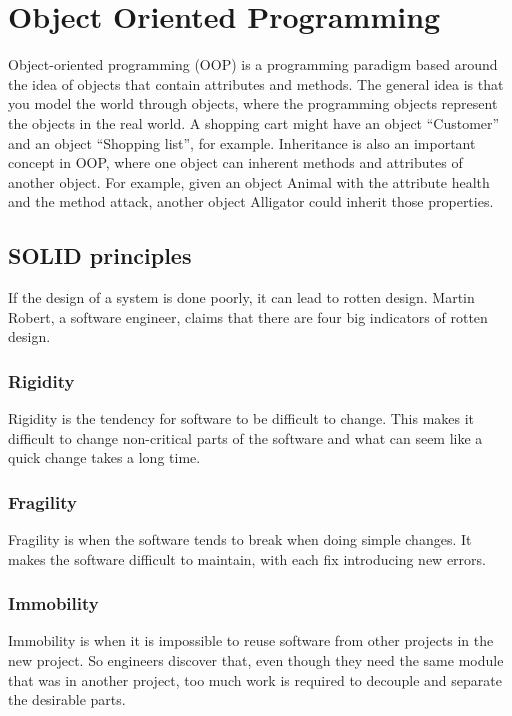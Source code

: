 \documentclass[12pt]{report}
\theoremstyle{definition}
\theoremstyle{theorem}
\begin{document}
\section{Object Oriented Programming}\label{oop}

Object-oriented programming (OOP) is a programming paradigm based around the
idea of objects that contain attributes and methods. The general idea is that
you model the world through objects, where the programming objects represent the
objects in the real world. A shopping cart might have an object ``Customer'' and
an object ``Shopping list'', for example. Inheritance is also an important
concept in OOP, where one object can inherent methods and attributes of another
object.  For example, given an object Animal with the attribute health and the
method attack, another object Alligator could inherit those
properties.~\cite{Gamma:1995:DPE:186897}

\subsection{SOLID principles}

If the design of a system is done poorly, it can lead to rotten design. Martin
Robert, a software engineer, claims that there are four big indicators of rotten
design.

\subsubsection*{Rigidity} Rigidity is the tendency for software to be difficult to
change. This makes it difficult to change non-critical parts of the software and
what can seem like a quick change takes a long time.

\subsubsection*{Fragility} Fragility is when the software tends to break when doing
simple changes. It makes the software difficult to maintain, with each fix
introducing new errors.

\subsubsection*{Immobility} Immobility is when it is impossible to reuse software from
other projects in the new project. So engineers discover that, even though they
need the same module that was in another project, too much work is required to
decouple and separate the desirable parts.
\end{document}
